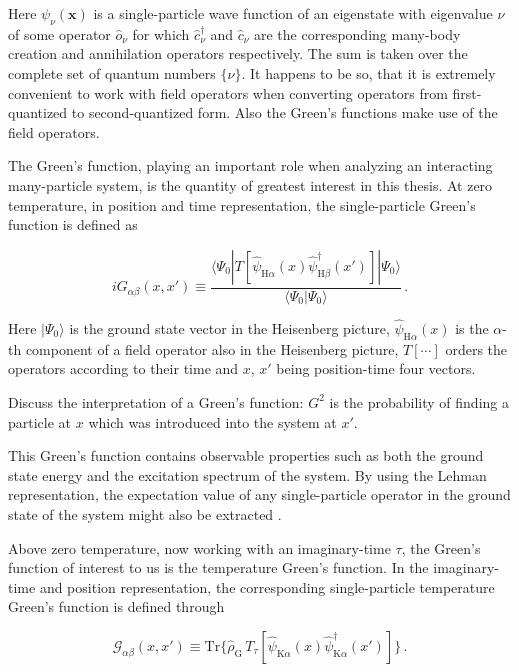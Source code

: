 \documentclass[12pt]{report}
\renewcommand{\vec}[1]{\boldsymbol{\mathbf{#1}}}                        %
\newcommand{\Gt}{\mathcal{G}}
\newcommand{\todo}[1]{{\leavevmode\color{todo}#1}}
\begin{document}
Here $ \psi_{\nu}(\vec x) $ is a single-particle wave function of an eigenstate with eigenvalue $ \nu $ of some operator $ \hat o_\nu $ for which $ \hat c^\dagger _\nu $ and $ \hat c _\nu $ are the corresponding many-body creation and annihilation operators respectively. The sum is taken over the complete set of quantum numbers $ \{ \nu \} $. It happens to be so, that it is extremely convenient to work with field operators when converting operators from first-quantized to second-quantized form. Also the Green's functions make use of the field operators.

The Green's function, playing an important role when analyzing an interacting many-particle system, is the quantity of greatest interest in this thesis. At zero temperature, in position and time representation, the single-particle Green's function is defined as

\begin{equation}
	i G_{\alpha \beta} (x, x')
	\equiv \frac{\langle \Psi_0 | T[\hat \psi_{\text{H} \alpha} (x) \hat \psi^\dagger_{\text{H} \beta} (x')] |\Psi_0 \rangle}{\langle \Psi_0 |\Psi_0 \rangle} \,.
\end{equation}

Here $ | \Psi_0 \rangle $ is the ground state vector in the Heisenberg picture, $ \hat \psi_{\text{H} \alpha}(x) $ is the $ \alpha $-th component of a field operator also in the Heisenberg picture, $ T[ \cdots ] $ orders the operators according to their time and $ x $, $ x' $ being position-time four vectors.

\todo{Discuss the interpretation of a Green's function: $ G^2 $ is the probability of finding a particle at $ x $ which was introduced into the system at $ x' $.}

This Green's function contains observable properties such as both the ground state energy and the excitation spectrum of the system.  By using the Lehman representation, the expectation value of any single-particle operator in the ground state of the system might also be extracted \cite{quantumTheoryOfManyParticleSystems}.

Above zero temperature, now working with an imaginary-time $ \tau $, the Green's function of interest to us is the temperature Green's function. In the imaginary-time and position representation, the corresponding single-particle temperature Green's function is defined through

\begin{equation}
	\Gt_{\alpha \beta} (x, x')
	\equiv \text{Tr} \{ \hat \rho_\text{G} \, T_\tau [\hat \psi_{\text{K} \alpha}(x) \hat \psi^\dagger_{\text{K} \alpha}(x') ] \} \,.
\end{equation}
\end{document}
